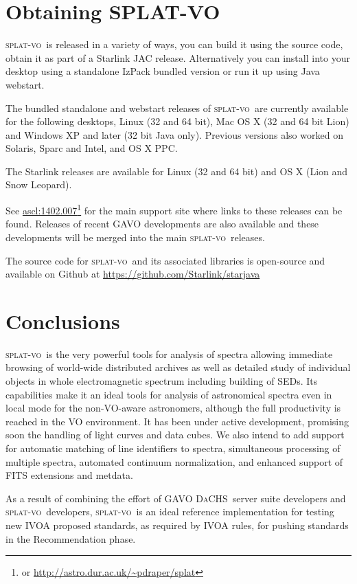 \documentclass[final,authoryear,5p,times,twocolumn]{elsarticle}
\newcommand{\splatvo}{\textsc{splat-vo}}
\newcommand{\dachs}{\textsc{DaCHS}}
\newcommand{\ascl}[1]{\href{http://www.ascl.net/#1}{ascl:#1}}
\begin{document}
\section{Obtaining SPLAT-VO}

\splatvo\ is released in a variety of ways, you can build it using the source
code, obtain it as part of a Starlink JAC release. Alternatively you can
install into your desktop using a standalone IzPack bundled version or run it
up using Java webstart.

The bundled standalone and webstart releases of \splatvo\ are currently
available for the following desktops, Linux (32 and 64 bit), Mac OS X (32 and
64 bit Lion) and Windows XP and later (32 bit Java only). Previous versions
also worked on Solaris, Sparc and Intel, and OS X PPC.

The Starlink releases
\citep[e.g.,][]{currie_adassxxiii,2013ASPC..475..247B} are available
for Linux (32 and 64 bit) and OS X (Lion and Snow Leopard).

See \ascl{1402.007}\footnote{or \url{http://astro.dur.ac.uk/~pdraper/splat}}
for the main support site where links to these releases can be found.
Releases of recent GAVO developments are also available and these
developments will be merged into the main \splatvo\ releases.

The source code for \splatvo\ and its associated libraries is
open-source and available on Github at
\url{https://github.com/Starlink/starjava}


\section{Conclusions}

\splatvo\ is the very powerful tools for analysis of spectra
allowing immediate browsing of world-wide distributed archives as well
as detailed study of individual objects in whole electromagnetic
spectrum including building of SEDs. Its capabilities make it an
ideal tools for analysis of astronomical spectra even in local mode
for the non-VO-aware astronomers, although the full productivity is
reached in the VO environment. It has been under active development, promising soon the handling of
light curves and data cubes. We also intend to add support for
automatic matching of line identifiers to spectra, simultaneous
processing of multiple spectra, automated continuum normalization, and
enhanced support of FITS extensions and metdata.

As a result of combining the effort of GAVO \dachs\ server suite
developers and \splatvo\ developers, \splatvo\ is an ideal reference
implementation for testing new IVOA proposed standards, as required by
IVOA rules, for pushing standards in the Recommendation phase.
\end{document}
